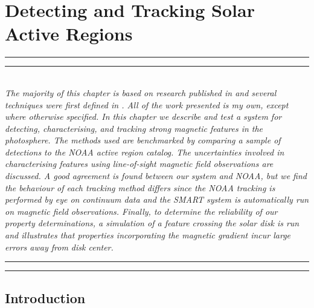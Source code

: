 
\chapter{Detecting and Tracking Solar Active Regions} %
\label{chapter:method_SMART}

\graphicspath{{2/figures/EPS/}{2/figures/}}

\glsresetall

\hrule height 1mm
\vspace{0.5mm}
\hrule height 0.4mm 
\noindent 
\\ {\it 
The majority of this chapter is based on research published in \emph{} and several techniques were first defined in \emph{}. All of the work presented is my own, except where otherwise specified. In this chapter we describe and test a system for detecting, characterising, and tracking strong magnetic features in the photosphere. The methods used are benchmarked by comparing a sample of detections to the NOAA active region catalog. The uncertainties involved in characterising features using line-of-sight magnetic field observations are discussed. A good agreement is found between our system and NOAA, but we find the behaviour of each tracking method differs since the NOAA tracking is performed by eye on continuum data and the SMART system is automatically run on magnetic field observations. Finally, to determine the reliability of our property determinations, a simulation of a feature crossing the solar disk is run and illustrates that properties incorporating the magnetic gradient incur large errors away from disk center.
}
\\ 
\hrule height 0.4mm
\vspace{0.5mm}
\hrule height 1mm 
\vspace{1.5cm}

\section{Introduction}

